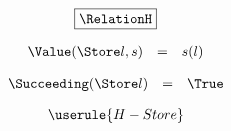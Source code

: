 \begin{equation*}
  \boxed{\RelationH}
\end{equation*}

\begin{equation*}
  \begin{array}{lcl}
    \Value(\Store l, s) &=& s(l)
  \end{array}
\end{equation*}

\begin{equation*}
  \begin{array}{lcl}
    \Succeeding(\Store l) &=& \True
  \end{array}
\end{equation*}

\begin{equation*}
  \userule{H-Store}
\end{equation*}
